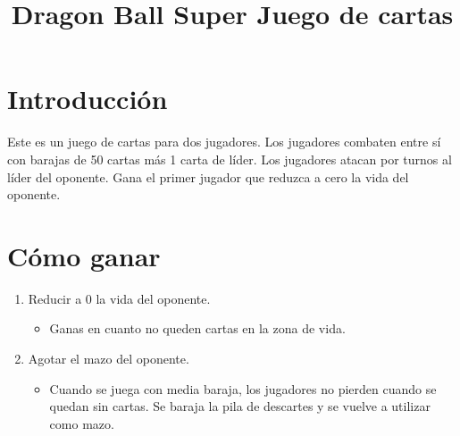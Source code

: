 \documentclass[10pt,a4paper]{article}
\title{Dragon Ball Super Juego de cartas}
\author{}
\date{}
\begin{document}
\sffamily

\maketitle

\section{\textsf{Introducción}}
  Este es un juego de cartas para dos jugadores. Los jugadores combaten entre sí con barajas de 50 cartas más 1 carta de líder. \newline
  Los jugadores atacan por turnos al líder del oponente. \newline
  Gana el primer jugador que reduzca a cero la vida del oponente.

\section{\textsf{Cómo ganar}}
  \begin{enumerate}
    \item Reducir a 0 la vida del oponente.
    \begin{itemize}
      \color{red} \item Ganas en cuanto no queden cartas en la zona de vida.
    \end{itemize}
    \item Agotar el mazo del oponente.
    \begin{itemize}
      \color{red} \item Cuando se juega con media baraja, los jugadores no pierden cuando se quedan sin cartas. Se baraja la pila de descartes y se vuelve a utilizar como mazo.
    \end{itemize}
  \end{enumerate}
\end{document}
